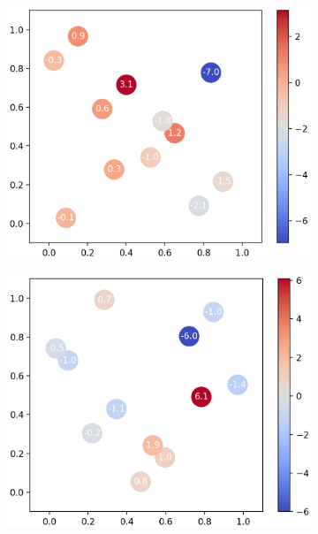 \documentclass[11pt]{article}
\begin{document}
\begin{figure}[H]
	\centering
	\begin{subfigure}[b]{0.325\textwidth}
		\centering
		\includegraphics[width=\textwidth]{assets/1d-sobol-1st}
		\caption{}
	\end{subfigure}
	\begin{subfigure}[b]{0.325\textwidth}
		\centering
		\includegraphics[width=\textwidth]{assets/1d-sobol-2nd}
		\caption{}
	\end{subfigure}
	\begin{subfigure}[b]{0.325\textwidth}

\end{subfigure}
\end{figure}
\end{document}
